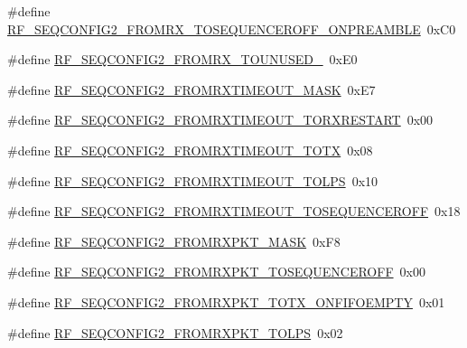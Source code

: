 \begin{DoxyCompactItemize}
\item 
\#define \mbox{\hyperlink{sx1276_regs-_fsk_8h_ad291c261a95d9171798bf2b564d1ac9c}{R\+F\+\_\+\+S\+E\+Q\+C\+O\+N\+F\+I\+G2\+\_\+\+F\+R\+O\+M\+R\+X\+\_\+\+T\+O\+S\+E\+Q\+U\+E\+N\+C\+E\+R\+O\+F\+F\+\_\+\+O\+N\+P\+R\+E\+A\+M\+B\+LE}}~0x\+C0
\item 
\#define \mbox{\hyperlink{sx1276_regs-_fsk_8h_a189edf62f7c74b86afb5d840272ed540}{R\+F\+\_\+\+S\+E\+Q\+C\+O\+N\+F\+I\+G2\+\_\+\+F\+R\+O\+M\+R\+X\+\_\+\+T\+O\+U\+N\+U\+S\+E\+D\+\_}}~0x\+E0
\item 
\#define \mbox{\hyperlink{sx1276_regs-_fsk_8h_a3d4b2324c35b3440327ddc622e57b54f}{R\+F\+\_\+\+S\+E\+Q\+C\+O\+N\+F\+I\+G2\+\_\+\+F\+R\+O\+M\+R\+X\+T\+I\+M\+E\+O\+U\+T\+\_\+\+M\+A\+SK}}~0x\+E7
\item 
\#define \mbox{\hyperlink{sx1276_regs-_fsk_8h_a61f477238d6ab34794c6beb2075f7c74}{R\+F\+\_\+\+S\+E\+Q\+C\+O\+N\+F\+I\+G2\+\_\+\+F\+R\+O\+M\+R\+X\+T\+I\+M\+E\+O\+U\+T\+\_\+\+T\+O\+R\+X\+R\+E\+S\+T\+A\+RT}}~0x00
\item 
\#define \mbox{\hyperlink{sx1276_regs-_fsk_8h_aafadf4e3c6d5afde4f45a52b150ac010}{R\+F\+\_\+\+S\+E\+Q\+C\+O\+N\+F\+I\+G2\+\_\+\+F\+R\+O\+M\+R\+X\+T\+I\+M\+E\+O\+U\+T\+\_\+\+T\+O\+TX}}~0x08
\item 
\#define \mbox{\hyperlink{sx1276_regs-_fsk_8h_a1e8856528e554ac06c0b15a0331af25f}{R\+F\+\_\+\+S\+E\+Q\+C\+O\+N\+F\+I\+G2\+\_\+\+F\+R\+O\+M\+R\+X\+T\+I\+M\+E\+O\+U\+T\+\_\+\+T\+O\+L\+PS}}~0x10
\item 
\#define \mbox{\hyperlink{sx1276_regs-_fsk_8h_ac8284b2e9e769af716e7e9e69d7489c3}{R\+F\+\_\+\+S\+E\+Q\+C\+O\+N\+F\+I\+G2\+\_\+\+F\+R\+O\+M\+R\+X\+T\+I\+M\+E\+O\+U\+T\+\_\+\+T\+O\+S\+E\+Q\+U\+E\+N\+C\+E\+R\+O\+FF}}~0x18
\item 
\#define \mbox{\hyperlink{sx1276_regs-_fsk_8h_af969ae590556e2c15a447e7fc528bd41}{R\+F\+\_\+\+S\+E\+Q\+C\+O\+N\+F\+I\+G2\+\_\+\+F\+R\+O\+M\+R\+X\+P\+K\+T\+\_\+\+M\+A\+SK}}~0x\+F8
\item 
\#define \mbox{\hyperlink{sx1276_regs-_fsk_8h_a6540dab5dd5ba1667a344a2c1f40a16e}{R\+F\+\_\+\+S\+E\+Q\+C\+O\+N\+F\+I\+G2\+\_\+\+F\+R\+O\+M\+R\+X\+P\+K\+T\+\_\+\+T\+O\+S\+E\+Q\+U\+E\+N\+C\+E\+R\+O\+FF}}~0x00
\item 
\#define \mbox{\hyperlink{sx1276_regs-_fsk_8h_a967bc541983c4f4ffd13d25eb67a751f}{R\+F\+\_\+\+S\+E\+Q\+C\+O\+N\+F\+I\+G2\+\_\+\+F\+R\+O\+M\+R\+X\+P\+K\+T\+\_\+\+T\+O\+T\+X\+\_\+\+O\+N\+F\+I\+F\+O\+E\+M\+P\+TY}}~0x01
\item 
\#define \mbox{\hyperlink{sx1276_regs-_fsk_8h_aa27b9d5f133d0c76752de6696f68de93}{R\+F\+\_\+\+S\+E\+Q\+C\+O\+N\+F\+I\+G2\+\_\+\+F\+R\+O\+M\+R\+X\+P\+K\+T\+\_\+\+T\+O\+L\+PS}}~0x02

\end{DoxyCompactItemize}
